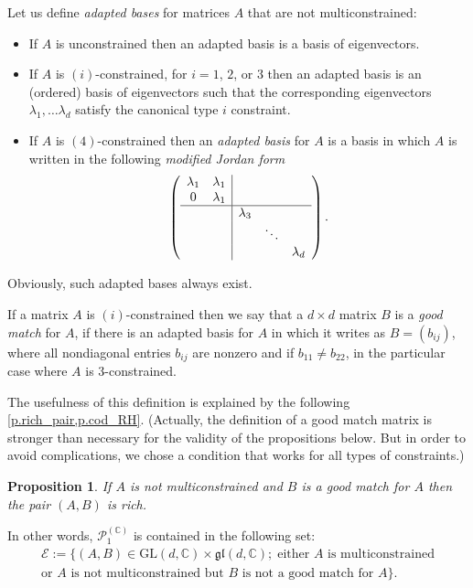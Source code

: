 \documentclass[10pt, a4paper]{amsart}
\theoremstyle{plain}
\newtheorem{prop}[lemma]{Proposition}
\theoremstyle{definition}
\theoremstyle{remark}
\theoremstyle{note}
\numberwithin{equation}{section}
\begin{document}
Let us define \emph{adapted bases} for matrices $A$ that are not multiconstrained:
\begin{itemize}
\item If $A$ is unconstrained then an adapted basis is a basis of eigenvectors.
\item If $A$ is $(i)$-constrained, for $i = 1$, $2$, or $3$ 
then an adapted basis is an (ordered) basis of eigenvectors such that
the corresponding eigenvectors $\lambda_1,\ldots \lambda_d$ 
satisfy the canonical type $i$ constraint.
\item If $A$ is $(4)$-constrained then an \emph{adapted basis} for $A$ 
is a basis in which $A$ is written in the following \emph{modified Jordan form} 
$$
\left(
\begin{array}{cc|ccc}
\lambda_1 & \lambda_1 &          &       &           \\
0         & \lambda_1 &          &       &           \\
\hline
          &           &\lambda_3 &       &           \\
          &           &          &\ddots &           \\
          &           &          &       &\lambda_d  
\end{array}
\right).
$$
\end{itemize}
Obviously, such adapted bases always exist.

If a matrix $A$ is $(i)$-constrained then we say that a 
$d \times d$ matrix $B$ is a \emph{good match} for $A$, 
if there is an adapted basis for $A$ in which 
it writes as $B = (b_{ij})$, 
where all nondiagonal entries $b_{ij}$ are nonzero and 
if $b_{11}\neq b_{22}$, in the particular case where $A$ is $3$-constrained.

The usefulness of this definition is explained by the following 
\cref{p.rich_pair,p.cod_RH}.
(Actually, the definition of a good match matrix is stronger than necessary for the validity of the propositions below. But in order to avoid complications, we chose a condition that works for all types of constraints.)

\begin{prop}\label{p.rich_pair}
If $A$ is not multiconstrained and $B$ is a good match for $A$ then the pair $(A,B)$ is rich.
\end{prop}

In other words, ${\mathcal{P}}^{({\mathbb{C}})}_1$ is contained in the following set:
\begin{multline}\label{e.explicit}
{\mathcal{E}}:=\big\{ (A,B) \in {\mathrm{GL}}(d,{\mathbb{C}}) \times {\mathfrak{gl}}(d,{\mathbb{C}}) ; \; 
\text{either $A$ is multiconstrained} \\
\text{or $A$ is not multiconstrained but $B$ is not a good match for $A$} \big\}.
\end{multline}
\end{document}
